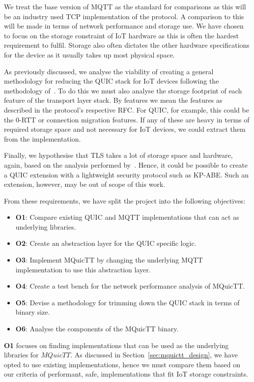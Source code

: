 We treat the base version of MQTT as the standard for comparisons as this will be an industry used TCP implementation of the protocol.
A comparison to this will be made in terms of network performance and storage use.
We have chosen to focus on the storage constraint of IoT hardware as this is often the hardest requirement to fulfil.
Storage also often dictates the other hardware specifications for the device as it usually takes up most physical space.

As previously discussed, we analyse the viability of creating a general methodology for reducing the QUIC stack for IoT devices following the methodology of~\cite{eggert_towards_2020}.
To do this we must also analyse the storage footprint of each feature of the transport layer stack.
By features we mean the features as described in the protocol's respective RFC.
For QUIC, for example, this could be the 0-RTT or connection migration features.
If any of these are heavy in terms of required storage space and not necessary for IoT devices, we could extract them from the implementation.

Finally, we hypothesise that TLS takes a lot of storage space and hardware, again, based on the analysis performed by~\cite{eggert_towards_2020}.
Hence, it could be possible to create a QUIC extension with a lightweight security protocol such as KP-ABE.
Such an extension, however, may be out of scope of this work.

From these requirements, we have split the project into the following objectives:

\begin{itemize}
    \item \textbf{O1}: Compare existing QUIC and MQTT implementations that can act as underlying libraries.
    \item \textbf{O2}: Create an abstraction layer for the QUIC specific logic.
    \item \textbf{O3}: Implement MQuicTT by changing the underlying MQTT implementation to use this abstraction layer.
    \item \textbf{O4}: Create a test bench for the network performance analysis of MQuicTT.
    \item \textbf{O5}: Devise a methodology for trimming down the QUIC stack in terms of binary size.
    \item \textbf{O6}: Analyse the components of the MQuicTT binary.
\end{itemize}

\textbf{O1} focuses on finding implementations that can be used as the underlying libraries for $MQuicTT$.
As discussed in Section~\ref{sec:mquictt_design}, we have opted to use existing implementations, hence we must compare them based on our criteria of performant, safe, implementations that fit IoT storage constraints.

